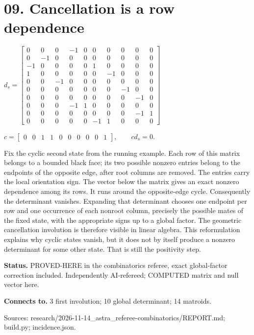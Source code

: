 \documentclass[10pt,a4paper]{amsart}
\begin{document}
\section*{09. Cancellation is a row dependence}
\begin{center}\begin{minipage}{.86\textwidth}\centering
$\displaystyle d_s=\left[\begin{matrix}0 & 0 & 0 & -1 & 0 & 0 & 0 & 0 & 0 & 0\\0 & -1 & 0 & 0 & 0 & 0 & 0 & 0 & 0 & 0\\-1 & 0 & 0 & 0 & 0 & 1 & 0 & 0 & 0 & 0\\1 & 0 & 0 & 0 & 0 & 0 & -1 & 0 & 0 & 0\\0 & 0 & -1 & 0 & 0 & 0 & 0 & 0 & 0 & 0\\0 & 0 & 0 & 0 & 0 & 0 & 0 & -1 & 0 & 0\\0 & 0 & 0 & 0 & 0 & 0 & 0 & 0 & -1 & 0\\0 & 0 & 0 & -1 & 1 & 0 & 0 & 0 & 0 & 0\\0 & 0 & 0 & 0 & 0 & 0 & 0 & 0 & -1 & 1\\0 & 0 & 0 & 0 & 0 & -1 & 1 & 0 & 0 & 0\end{matrix}\right]$\par\medskip $\displaystyle c=\left[\begin{matrix}0 & 0 & 1 & 1 & 0 & 0 & 0 & 0 & 0 & 1\end{matrix}\right],\qquad c d_s=0.$
\end{minipage}\end{center}
Fix the cyclic second state from the running example. Each row of this matrix belongs to a bounded black face; its two possible nonzero entries belong to the endpoints of the opposite edge, after root columns are removed. The entries carry the local orientation sign. The vector below the matrix gives an exact nonzero dependence among its rows. It runs around the opposite-edge cycle. Consequently the determinant vanishes. Expanding that determinant chooses one endpoint per row and one occurrence of each nonroot column, precisely the possible mates of the fixed state, with the appropriate signs up to a global factor. The geometric cancellation involution is therefore visible in linear algebra. This reformulation explains why cyclic states vanish, but it does not by itself produce a nonzero determinant for some other state. That is still the positivity step.

\textbf{Status.} PROVED-HERE in the combinatorics referee, exact global-factor correction included. Independently AI-refereed; COMPUTED matrix and null vector here.

\textbf{Connects to.} 3 first involution; 10 global determinant; 14 matroids.

{\footnotesize\raggedright Sources: research/\allowbreak{}2026-11-14\_astra\_referee-combinatorics/\allowbreak{}REPORT.md;\allowbreak{} build.py;\allowbreak{} incidence.json.\par}
\end{document}
